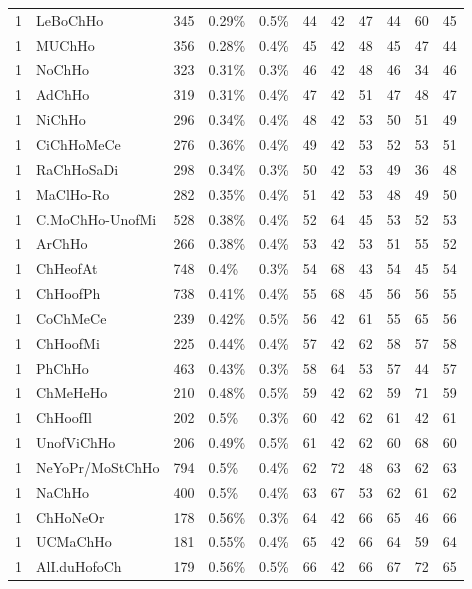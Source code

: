 \begin{longtable}{lllllrrrrrr}
  1 & LeBoChHo & 345 & 0.29\% & 0.5\% &  44 &  42 &  47 &  44 &  60 &  45 \\ 
  1 & MUChHo & 356 & 0.28\% & 0.4\% &  45 &  42 &  48 &  45 &  47 &  44 \\ 
  1 & NoChHo & 323 & 0.31\% & 0.3\% &  46 &  42 &  48 &  46 &  34 &  46 \\ 
  1 & AdChHo & 319 & 0.31\% & 0.4\% &  47 &  42 &  51 &  47 &  48 &  47 \\ 
  1 & NiChHo & 296 & 0.34\% & 0.4\% &  48 &  42 &  53 &  50 &  51 &  49 \\ 
  1 & CiChHoMeCe & 276 & 0.36\% & 0.4\% &  49 &  42 &  53 &  52 &  53 &  51 \\ 
  1 & RaChHoSaDi & 298 & 0.34\% & 0.3\% &  50 &  42 &  53 &  49 &  36 &  48 \\ 
  1 & MaClHo-Ro & 282 & 0.35\% & 0.4\% &  51 &  42 &  53 &  48 &  49 &  50 \\ 
  1 & C.MoChHo-UnofMi & 528 & 0.38\% & 0.4\% &  52 &  64 &  45 &  53 &  52 &  53 \\ 
  1 & ArChHo & 266 & 0.38\% & 0.4\% &  53 &  42 &  53 &  51 &  55 &  52 \\ 
  1 & ChHeofAt & 748 & 0.4\% & 0.3\% &  54 &  68 &  43 &  54 &  45 &  54 \\ 
  1 & ChHoofPh & 738 & 0.41\% & 0.4\% &  55 &  68 &  45 &  56 &  56 &  55 \\ 
  1 & CoChMeCe & 239 & 0.42\% & 0.5\% &  56 &  42 &  61 &  55 &  65 &  56 \\ 
  1 & ChHoofMi & 225 & 0.44\% & 0.4\% &  57 &  42 &  62 &  58 &  57 &  58 \\ 
  1 & PhChHo & 463 & 0.43\% & 0.3\% &  58 &  64 &  53 &  57 &  44 &  57 \\ 
  1 & ChMeHeHo & 210 & 0.48\% & 0.5\% &  59 &  42 &  62 &  59 &  71 &  59 \\ 
  1 & ChHoofIl & 202 & 0.5\% & 0.3\% &  60 &  42 &  62 &  61 &  42 &  61 \\ 
  1 & UnofViChHo & 206 & 0.49\% & 0.5\% &  61 &  42 &  62 &  60 &  68 &  60 \\ 
  1 & NeYoPr/MoStChHo & 794 & 0.5\% & 0.4\% &  62 &  72 &  48 &  63 &  62 &  63 \\ 
  1 & NaChHo & 400 & 0.5\% & 0.4\% &  63 &  67 &  53 &  62 &  61 &  62 \\ 
  1 & ChHoNeOr & 178 & 0.56\% & 0.3\% &  64 &  42 &  66 &  65 &  46 &  66 \\ 
  1 & UCMaChHo & 181 & 0.55\% & 0.4\% &  65 &  42 &  66 &  64 &  59 &  64 \\ 
  1 & AlI.duHofoCh & 179 & 0.56\% & 0.5\% &  66 &  42 &  66 &  67 &  72 &  65 \\ 

\end{longtable}
